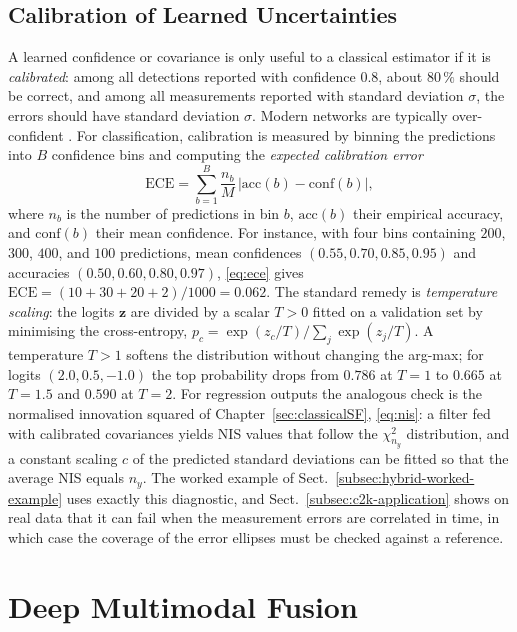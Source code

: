 \documentclass[graybox,envcountchap]{style/SNmono}
\begin{document}
\subsection{Calibration of Learned Uncertainties}
\label{subsec:calibration}
A learned confidence or covariance is only useful to a classical estimator if it is \emph{calibrated}: among all detections reported with confidence $0.8$, about $80\,\%$ should be correct, and among all measurements reported with standard deviation $\sigma$, the errors should have standard deviation $\sigma$. Modern networks are typically over-confident \cite{guo2017_calibration}. For classification, calibration is measured by binning the predictions into $B$ confidence bins and computing the \emph{expected calibration error}
\begin{equation}
\mathrm{ECE}=\sum_{b=1}^{B}\frac{n_b}{M}\,\big|\mathrm{acc}(b)-\mathrm{conf}(b)\big| ,
\label{eq:ece}
\end{equation}
where $n_b$ is the number of predictions in bin $b$, $\mathrm{acc}(b)$ their empirical accuracy, and $\mathrm{conf}(b)$ their mean confidence. For instance, with four bins containing $200$, $300$, $400$, and $100$ predictions, mean confidences $(0.55,0.70,0.85,0.95)$ and accuracies $(0.50,0.60,0.80,0.97)$, \eqref{eq:ece} gives $\mathrm{ECE}=(10+30+20+2)/1000=0.062$. The standard remedy is \emph{temperature scaling}: the logits $\mathbf{z}$ are divided by a scalar $T>0$ fitted on a validation set by minimising the cross-entropy, $p_c=\exp(z_c/T)/\sum_j\exp(z_j/T)$. A temperature $T>1$ softens the distribution without changing the arg-max; for logits $(2.0,0.5,-1.0)$ the top probability drops from $0.786$ at $T=1$ to $0.665$ at $T=1.5$ and $0.590$ at $T=2$. For regression outputs the analogous check is the normalised innovation squared of Chapter~\ref{sec:classicalSF}, \eqref{eq:nis}: a filter fed with calibrated covariances yields NIS values that follow the $\chi^{2}_{n_y}$ distribution, and a constant scaling $c$ of the predicted standard deviations can be fitted so that the average NIS equals $n_y$. The worked example of Sect.~\ref{subsec:hybrid-worked-example} uses exactly this diagnostic, and Sect.~\ref{subsec:c2k-application} shows on real data that it can fail when the measurement errors are correlated in time, in which case the coverage of the error ellipses must be checked against a reference.

\section{Deep Multimodal Fusion}
\end{document}
